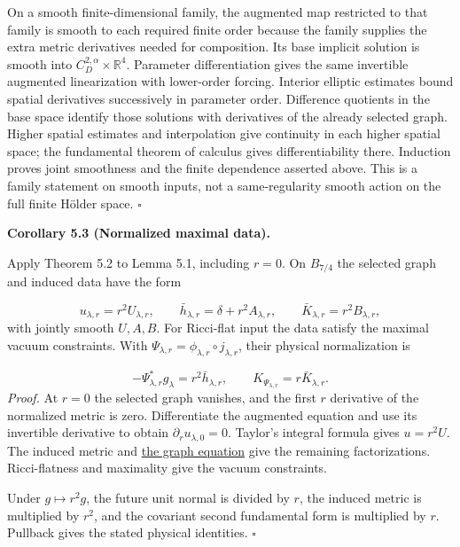 \documentclass[
  english,
  11pt,
  reqno]{amsart}
\makeatletter
\newcommand{\pandocstatementheading}[1]{%
  \par\addpenalty{\@beginparpenalty}%
  \addvspace{.5\baselineskip plus .2\baselineskip minus .2\baselineskip}%
  {\normalfont\bfseries #1\par}%
  \nobreak\@afterindenttrue\@afterheading
}
\makeatother
\begin{document}
On a smooth finite-dimensional family, the augmented map restricted to
that family is smooth to each required finite order because the family
supplies the extra metric derivatives needed for composition. Its base
implicit solution is smooth into \(C_D^{2,\alpha}\times\mathbb R^4\).
Parameter differentiation gives the same invertible augmented
linearization with lower-order forcing. Interior elliptic estimates
bound spatial derivatives successively in parameter order. Difference
quotients in the base space identify those solutions with derivatives of
the already selected graph. Higher spatial estimates and interpolation
give continuity in each higher spatial space; the fundamental theorem of
calculus gives differentiability there. Induction proves joint
smoothness and the finite dependence asserted above. This is a family
statement on smooth inputs, not a same-regularity smooth action on the
full finite Hölder space. \hfill\(\square\)

\pandocstatementheading{\leavevmode{}\label{cor:submission-normalized-maximal-data}Corollary 5.3 (Normalized maximal data).}

Apply Theorem 5.2 to Lemma 5.1, including \(r=0\). On \(B_{7/4}\) the
selected graph and induced data have the form

\label{eq:submission-normalized-maximal-data} \[
u_{\lambda,r}=r^2U_{\lambda,r},
\qquad
\bar h_{\lambda,r}=\delta+r^2A_{\lambda,r},
\qquad
\bar K_{\lambda,r}=r^2B_{\lambda,r},
\] with jointly smooth \(U,A,B\). For Ricci-flat input the data satisfy
the maximal vacuum constraints. With
\(\Psi_{\lambda,r}=\phi_{\lambda,r}\circ j_{\lambda,r}\), their physical
normalization is

\label{eq:submission-physical-graph-data} \[
-\Psi_{\lambda,r}^*g_\lambda=r^2\bar h_{\lambda,r},
\qquad
K_{\Psi_{\lambda,r}}=r\bar K_{\lambda,r}.
\] \emph{Proof.} At \(r=0\) the selected graph vanishes, and the first
\(r\) derivative of the normalized metric is zero. Differentiate the
augmented equation and use its invertible derivative to obtain
\(\partial_ru_{\lambda,0}=0\). Taylor's integral formula gives
\(u=r^2U\). The induced metric and
\hyperref[eq:submission-maximal-graph-equation]{the graph equation} give
the remaining factorizations. Ricci-flatness and maximality give the
vacuum constraints.

Under \(g\mapsto r^2g\), the future unit normal is divided by \(r\), the
induced metric is multiplied by \(r^2\), and the covariant second
fundamental form is multiplied by \(r\). Pullback gives the stated
physical identities. \hfill\(\square\)
\end{document}
